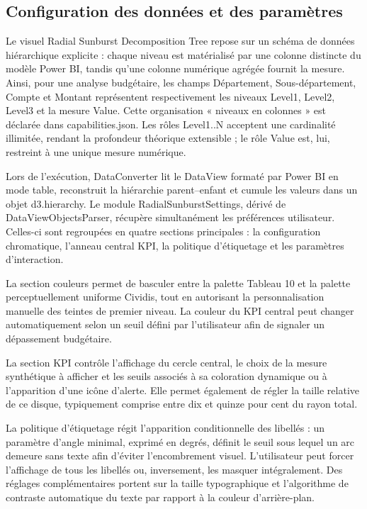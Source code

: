 \subsection{Configuration des données et des paramètres}
\label{subsec:4B-config}

\setlength{\parindent}{0pt}

Le visuel Radial Sunburst Decomposition Tree  repose sur un schéma de données hiérarchique explicite : chaque niveau est matérialisé par une colonne distincte du modèle Power BI, tandis qu’une colonne numérique agrégée fournit la mesure. Ainsi, pour une analyse budgétaire, les champs Département, Sous-département, Compte et Montant représentent respectivement les niveaux Level1, Level2, Level3 et la mesure Value. Cette organisation « niveaux en colonnes » est déclarée dans capabilities.json. Les rôles Level1..N acceptent une cardinalité illimitée, rendant la profondeur théorique extensible ; le rôle Value est, lui, restreint à une unique mesure numérique.

Lors de l’exécution, DataConverter lit le DataView formaté par Power BI en mode table, reconstruit la hiérarchie parent–enfant et cumule les valeurs dans un objet d3.hierarchy. Le module RadialSunburstSettings, dérivé de DataViewObjectsParser, récupère simultanément les préférences utilisateur. Celles-ci sont regroupées en quatre sections principales : la configuration chromatique, l’anneau central KPI, la politique d’étiquetage et les paramètres d’interaction.

La section couleurs permet de basculer entre la palette Tableau 10 et la palette perceptuellement uniforme Cividis, tout en autorisant la personnalisation manuelle des teintes de premier niveau. La couleur du KPI central peut changer automatiquement selon un seuil défini par l’utilisateur afin de signaler un dépassement budgétaire.

La section KPI contrôle l’affichage du cercle central, le choix de la mesure synthétique à afficher et les seuils associés à sa coloration dynamique ou à l’apparition d’une icône d’alerte. Elle permet également de régler la taille relative de ce disque, typiquement comprise entre dix et quinze pour cent du rayon total.

La politique d’étiquetage régit l’apparition conditionnelle des libellés : un paramètre d’angle minimal, exprimé en degrés, définit le seuil sous lequel un arc demeure sans texte afin d’éviter l’encombrement visuel. L’utilisateur peut forcer l’affichage de tous les libellés ou, inversement, les masquer intégralement. Des réglages complémentaires portent sur la taille typographique et l’algorithme de contraste automatique du texte par rapport à la couleur d’arrière-plan.

